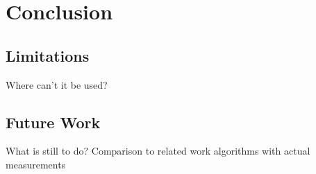 \chapter{Conclusion}
\section{Limitations}
  Where can't it be used?\newline
\section{Future Work}
  What is still to do?\newline
  Comparison to related work algorithms with actual measurements\newline
